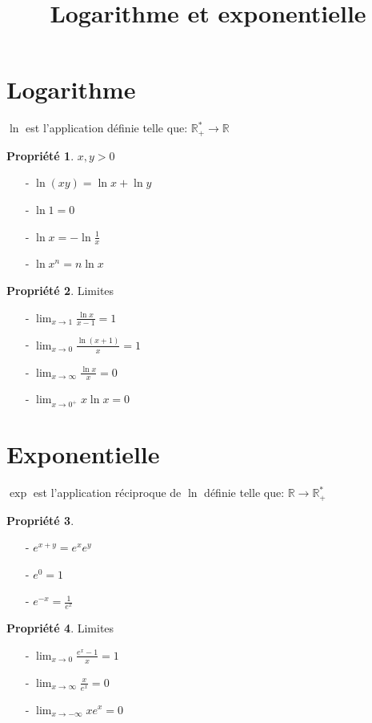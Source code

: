 \documentclass[fleqn]{article}
\title{Logarithme et exponentielle}
\date{}
\theoremstyle{definition} \newtheorem*{defi}{D\'efinition}
\theoremstyle{definition} \newtheorem*{theo}{Th\'eor\`eme}
\theoremstyle{definition} \newtheorem*{prop}{Propri\'et\'e}
\begin{document}
\maketitle

\section{Logarithme}
$\ln$ est l'application d\'efinie telle que: $\mathbb{R}^*_+ \rightarrow \mathbb{R}$
\begin{prop} $x,y > 0$
	\begin{itemize}
		\item [-] $\ln (xy) = \ln x + \ln y$
		\item [-] $\ln 1 = 0$
		\item [-] $\ln x = -\ln \frac{1}{x}$
		\item [-] $\ln x^n = n\ln x$
	\end{itemize}
\end{prop}
\begin{prop} Limites
	\begin{itemize}
		\item [-] $\lim_{x\to 1} \frac{\ln x}{x-1} = 1$
		\item [-] $\lim_{x\to 0} \frac{\ln (x+1)}{x} = 1$
		\item [-] $\lim_{x\to\infty} \frac{\ln x}{x} = 0$
		\item [-] $\lim_{x\to 0^+} x\ln x = 0$
	\end{itemize}
\end{prop}

\section{Exponentielle}
$\exp$ est l'application r\'eciproque de $\ln$ d\'efinie telle que: $\mathbb{R} \rightarrow \mathbb{R}^*_+$
\begin{prop} $ $
	\begin{itemize}
		\item [-] $e^{x+y} = e^xe^y$
		\item [-] $e^0 = 1$
		\item [-] $e^{-x} = \frac{1}{e^x}$
	\end{itemize}
\end{prop}
\begin{prop} Limites
	\begin{itemize}
		\item [-] $\lim_{x\to 0} \frac{e^x-1}{x} = 1$
		\item [-] $\lim_{x\to\infty} \frac{x}{e^x} = 0$
		\item [-] $\lim_{x\to-\infty} xe^x = 0$
	\end{itemize}
\end{prop}
\end{document}
